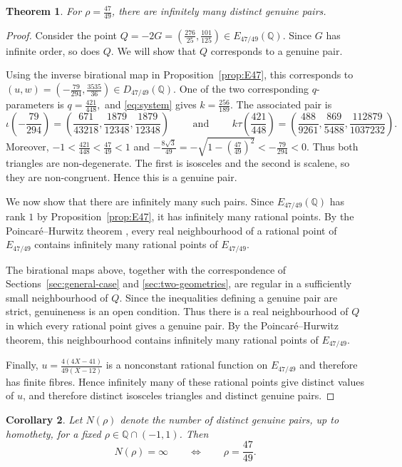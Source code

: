 \documentclass[11pt]{amsart}
\theoremstyle{plain}
\newtheorem{thm}{Theorem}[section]
\newtheorem{coro}[thm]{Corollary}
\theoremstyle{remark}
\theoremstyle{plain}
\newcommand{\Q}{\mathbb{Q}}
\begin{document}
\begin{thm}\label{thm:47-infinite}
For $\rho=\frac{47}{49}$, there are infinitely many distinct genuine
pairs.
\end{thm}

\begin{proof}
Consider the point
$Q=-2G= \left(\frac{276}{25},\frac{101}{125}\right)\in E_{47/49}(\Q)$.
Since $G$ has infinite order, so does $Q$. We will show that $Q$
corresponds to a genuine pair.





Using the inverse birational map in Proposition~\ref{prop:E47}, this
corresponds to
$\left(u,w\right) = \left(-\frac{79}{294},\frac{3535}{36}\right) \in D_{47/49}(\Q)$.
One of the two corresponding $q$-parameters is
$q=\frac{421}{448},$
and \eqref{eq:system} gives $
k=\frac{256}{189}.$
The associated pair is
\[
\iota\left(-\frac{79}{294}\right)
=
\left(
\frac{671}{43218},
\frac{1879}{12348},
\frac{1879}{12348}
\right) \qquad
\mbox{ and }
\qquad
k\tau\left(\frac{421}{448}\right)
=
\left(
\frac{488}{9261},
\frac{869}{5488},
\frac{112879}{1037232}
\right).
\]
Moreover,
$-1<\frac{421}{448}<\frac{47}{49}<1$
and
$
-\frac{8\sqrt3}{49}
=
-\sqrt{1-\left(\frac{47}{49}\right)^2}
<
-\frac{79}{294}
<0.$
Thus both triangles are non-degenerate. The first is isosceles and the
second is scalene, so they are non-congruent. Hence this is a genuine
pair.


We now show that there are infinitely many such pairs. Since
$E_{47/49}(\Q)$ has rank $1$ by Proposition~\ref{prop:E47}, it has
infinitely many rational points. By the Poincar\'e--Hurwitz theorem
\cite[Satz~11, p.~78]{Skolem}, every real neighbourhood of a rational
point of $E_{47/49}$ contains infinitely many rational points of
$E_{47/49}$.


The birational maps above, together with the correspondence of
Sections~\ref{sec:general-case} and \ref{sec:two-geometries}, are regular in a sufficiently small
neighbourhood of $Q$. Since the inequalities defining a genuine pair
are strict, genuineness is an open condition. Thus there is a real
neighbourhood of $Q$ in which every rational point gives a genuine
pair. By the Poincar\'e--Hurwitz theorem, this neighbourhood contains
infinitely many rational points of $E_{47/49}$.


Finally,
$u=\frac{4(4X-41)}{49(X-12)}$
is a nonconstant rational function on $E_{47/49}$ and therefore has
finite fibres. Hence infinitely many of these rational points give
distinct values of $u$, and therefore distinct isosceles triangles and
distinct genuine pairs.

\end{proof}
\begin{coro}\label{cor:finite-infinite}
Let $N(\rho)$ denote the number of distinct genuine pairs, up to
homothety, for a fixed $\rho\in\Q\cap(-1,1)$. Then
\[N(\rho)=\infty \qquad\Longleftrightarrow\qquad \rho=\frac{47}{49}.\]
\end{coro}
\end{document}
